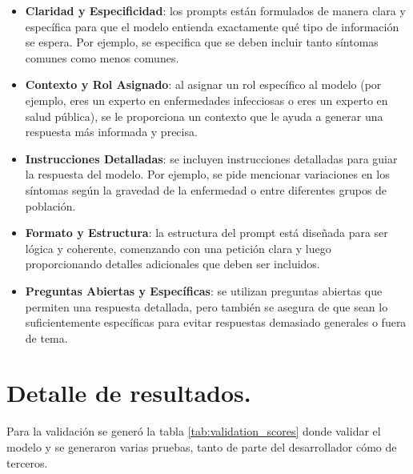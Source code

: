 \begin{itemize}
    \item \textbf{Claridad y Especificidad}: los prompts están formulados de manera clara y específica para que el modelo entienda exactamente qué tipo de información se espera. Por ejemplo, se especifica que se deben incluir tanto síntomas comunes como menos comunes.
    \item \textbf{Contexto y Rol Asignado}: al asignar un rol específico al modelo (por ejemplo, eres un experto en enfermedades infecciosas o eres un experto en salud pública), se le proporciona un contexto que le ayuda a generar una respuesta más informada y precisa.
    \item \textbf{Instrucciones Detalladas}: se incluyen instrucciones detalladas para guiar la respuesta del modelo. Por ejemplo, se pide mencionar variaciones en los síntomas según la gravedad de la enfermedad o entre diferentes grupos de población.
    \item \textbf{Formato y Estructura}: la estructura del prompt está diseñada para ser lógica y coherente, comenzando con una petición clara y luego proporcionando detalles adicionales que deben ser incluidos.
    \item \textbf{Preguntas Abiertas y Específicas}: se utilizan preguntas abiertas que permiten una respuesta detallada, pero también se asegura de que sean lo suficientemente específicas para evitar respuestas demasiado generales o fuera de tema.
\end{itemize}

\section{Detalle de resultados.}

Para la validación se generó la tabla \ref{tab:validation_scores} donde validar el modelo y se generaron varias pruebas, tanto de parte del desarrollador cómo de terceros.

